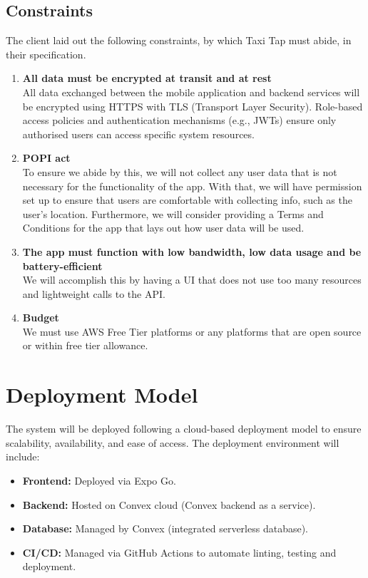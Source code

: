 \documentclass[a4paper,12pt]{article}
\begin{document}
\subsection{Constraints}
The client laid out the following constraints, by which Taxi Tap must abide, in their specification.

\begin{enumerate}
    \item \textbf{All data must be encrypted at transit and at rest}\\
    All data exchanged between the mobile application and backend services will be encrypted using HTTPS with TLS (Transport Layer Security). Role-based access policies and authentication mechanisms (e.g., JWTs) ensure only authorised users can access specific system resources.

    \item \textbf{POPI act}\\
    To ensure we abide by this, we will not collect any user data that is not necessary for the functionality of the app. With that, we will have permission set up to ensure that users are comfortable with collecting info, such as the user’s location. Furthermore, we will consider providing a Terms and Conditions for the app that lays out how user data will be used.

    \item \textbf{The app must function with low bandwidth, low data usage and be battery-efficient}\\
    We will accomplish this by having a UI that does not use too many resources and lightweight calls to the API.

    \item \textbf{Budget}\\
    We must use AWS Free Tier platforms or any platforms that are open source or within free tier allowance.
\end{enumerate}

\section{Deployment Model}
The system will be deployed following a cloud-based deployment model to ensure scalability, availability, and ease of access. The deployment environment will include:
\begin{itemize}
    \item \textbf{Frontend:} Deployed via Expo Go.
    \item \textbf{Backend:} Hosted on Convex cloud (Convex backend as a service).
    \item \textbf{Database:}  Managed by Convex (integrated serverless database).
    \item \textbf{CI/CD:} Managed via GitHub Actions to automate linting, testing and deployment.
\end{itemize}
\end{document}
